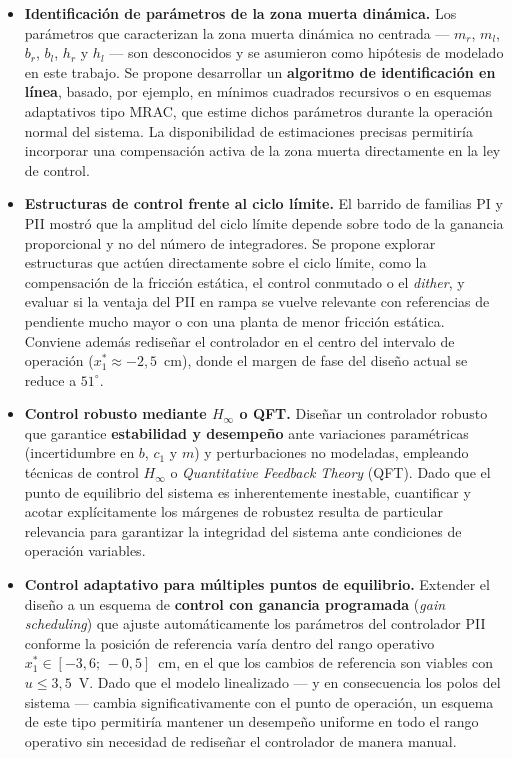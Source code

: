 \begin{itemize}
    \item \textbf{Identificación de parámetros de la zona muerta dinámica.}
    Los parámetros que caracterizan la zona muerta dinámica no centrada --- $m_r$, $m_l$,
    $b_r$, $b_l$, $h_r$ y $h_l$ --- son desconocidos y se asumieron como hipótesis de
    modelado en este trabajo. Se propone desarrollar un \textbf{algoritmo de identificación
    en línea}, basado, por ejemplo, en mínimos cuadrados recursivos o en esquemas
    adaptativos tipo MRAC, que estime dichos parámetros durante la operación normal del
    sistema. La disponibilidad de estimaciones precisas permitiría incorporar una
    compensación activa de la zona muerta directamente en la ley de control.

    \item \textbf{Estructuras de control frente al ciclo límite.}
    El barrido de familias PI y PII mostró que la amplitud del ciclo límite depende sobre todo
    de la ganancia proporcional y no del número de integradores. Se propone explorar
    estructuras que actúen directamente sobre el ciclo límite, como la compensación de la
    fricción estática, el control conmutado o el \textit{dither}, y evaluar si la ventaja del PII
    en rampa se vuelve relevante con referencias de pendiente mucho mayor o con una planta de
    menor fricción estática. Conviene además rediseñar el controlador en el centro del
    intervalo de operación ($x_1^*\approx-2{,}5$~cm), donde el margen de fase del diseño actual
    se reduce a $51^\circ$.

    \item \textbf{Control robusto mediante $H_\infty$ o QFT.}
    Diseñar un controlador robusto que garantice \textbf{estabilidad y desempeño} ante
    variaciones paramétricas (incertidumbre en $b$, $c_1$ y $m$) y perturbaciones no
    modeladas, empleando técnicas de control $H_\infty$ o \textit{Quantitative Feedback
    Theory} (QFT). Dado que el punto de equilibrio del sistema es inherentemente inestable,
    cuantificar y acotar explícitamente los márgenes de robustez resulta de particular
    relevancia para garantizar la integridad del sistema ante condiciones de operación
    variables.

    \item \textbf{Control adaptativo para múltiples puntos de equilibrio.}
    Extender el diseño a un esquema de \textbf{control con ganancia programada}
    (\textit{gain scheduling}) que ajuste automáticamente los parámetros del controlador
    PII conforme la posición de referencia varía dentro del rango operativo
    $x_1^* \in [-3{,}6;\,-0{,}5]$~cm, en el que los cambios de referencia son viables con $u\le 3{,}5$~V. Dado que el modelo linealizado --- y en consecuencia
    los polos del sistema --- cambia significativamente con el punto de operación, un
    esquema de este tipo permitiría mantener un desempeño uniforme en todo el rango operativo
    sin necesidad de rediseñar el controlador de manera manual.


\end{itemize}
